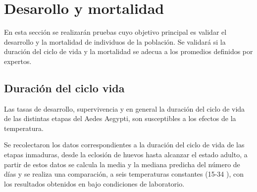 \section{Desarollo y mortalidad}
En esta sección se realizarán pruebas cuyo objetivo principal es validar el desarrollo y la mortalidad de
individuos de la población. Se validará si la duración del ciclo de vida y la mortalidad se adecua a los
promedios definidos por expertos.

\subsection{Duración del ciclo vida}
Las tasas de desarrollo, supervivencia y en general la duración del ciclo de vida de las distintas
etapas del Aedes Aegypti, son susceptibles a los efectos de la temperatura. 

Se recolectaron los datos correspondientes a la duración del ciclo de vida de las etapas inmaduras, desde
la eclosión de huevos  hasta alcanzar el estado adulto, a partir de estos datos se calcula la media y la
mediana predicha del número de días y se realiza una comparación, a seis temperaturas constantes 
(15-34 \textcelsius), con los resultados obtenidos en  \cite{rueda1990temperature} bajo condiciones de
laboratorio.

